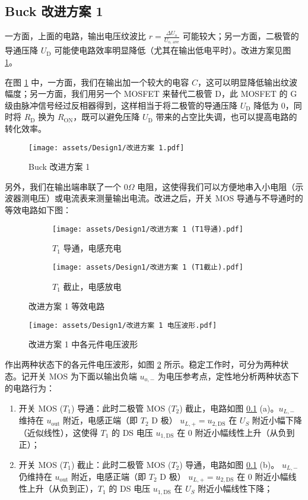 \documentclass[UTF8]{article}
\theoremstyle{MyLineTheoremStyle} %
\theoremstyle{MyBlockTheoremStyle} %
\theoremstyle{MySubsubsectionStyle} %
\begin{document}
\subsection{Buck 改进方案 1}
一方面，上面的电路，输出电压纹波比 $r = \frac{\Delta U_{\text{o}}}{U_{\text{o, ave}}}$ 可能较大；另一方面，二极管的导通压降 $U_\text{D}$ 可能使电路效率明显降低（尤其在输出低电平时）。改进方案见图 \ref{Buck 改进方案 1}。

在图 \ref{Buck 改进方案 1} 中，一方面，我们在输出加一个较大的电容 $C$，这可以明显降低输出纹波幅度；另一方面，我们用另一个 MOSFET 来替代二极管 D，此 MOSFET 的 G 级由脉冲信号经过反相器得到，这样相当于将二极管的导通压降 $U_\text{D}$ 降低为 $0$，同时将 $R_{\text{D}}$ 换为 $R_{\text{ON}}$，既可以避免压降 $U_{\text{D}}$ 带来的占空比失调，也可以提高电路的转化效率。

\begin{figure}[H]\centering
    \texttt{[image: assets/Design1/改进方案 1.pdf]}
    \caption{Buck 改进方案 1}
    \label{Buck 改进方案 1}
\end{figure}

另外，我们在输出端串联了一个 $0 \Omega$ 电阻，这使得我们可以方便地串入小电阻（示波器测电压）或电流表来测量输出电流。改进之后，开关 MOS 导通与不导通时的等效电路如下图：
\begin{figure}[H]\centering
\begin{subfigure}[b]{0.5\columnwidth}\centering
    \texttt{[image: assets/Design1/改进方案 1 (T1导通).pdf]}
    \caption{$T_1$ 导通，电感充电}
\end{subfigure}\hfill
\begin{subfigure}[b]{0.5\columnwidth}\centering
    \texttt{[image: assets/Design1/改进方案 1 (T1截止).pdf]}
    \caption{$T_1$ 截止，电感放电}
\end{subfigure}
\caption{改进方案 1 等效电路}
\end{figure}

\begin{figure}[H]\centering
    \texttt{[image: assets/Design1/改进方案 1 电压波形.pdf]}
    \caption{改进方案 1 中各元件电压波形}
    \label{改进方案 1 中各元件电压波形}
\end{figure}

作出两种状态下的各元件电压波形，如图 \ref{改进方案 1 中各元件电压波形} 所示。稳定工作时，可分为两种状态。记开关 MOS 为下面以输出负端 $u_{o, -}$ 为电压参考点，定性地分析两种状态下的电路行为：
\begin{enumerate}
\item 开关 MOS ($T_1$) 导通：此时二极管 MOS ($T_2$) 截止，电路如图 \ref{} (a)。$u_{L, -}$ 维持在 $u_\text{out}$ 附近，电感正端（即 $T_2$ D 极）
$u_{L, +} = u_{2, \text{DS}}$ 在 $U_S$ 附近小幅下降（近似线性），这使得 $T_1$ 的 DS 电压 $u_{1, \text{DS}}$ 在 0 附近小幅线性上升（从负到正）；
\item 开关 MOS ($T_1$) 截止：此时二极管 MOS ($T_2$) 导通，电路如图 \ref{} (b)。
$u_{L, -}$ 仍维持在 $u_\text{out}$ 附近，电感正端（即 $T_2$ D 极）
$u_{L, +} = u_{2, \text{DS}}$ 在 $0$ 附近小幅线性上升（从负到正），$T_1$ 的 DS 电压 $u_{1, \text{DS}}$ 在 $U_S$ 附近小幅线性下降；
\end{enumerate}
\end{document}
